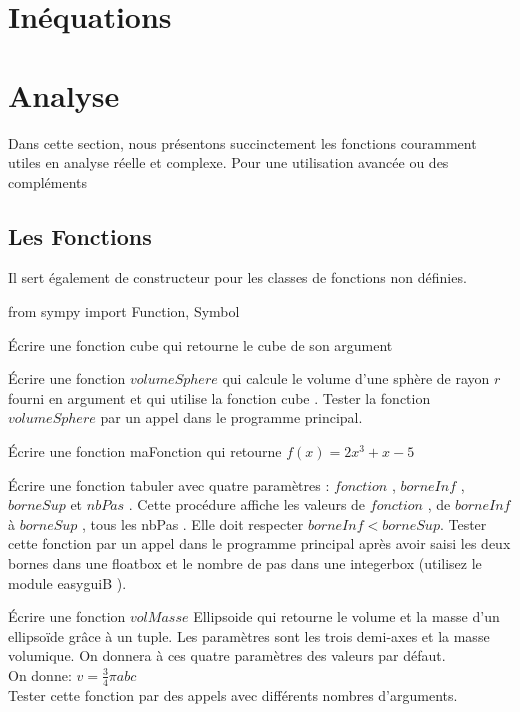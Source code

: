 \section{In\'equations}
\section{Analyse}
Dans cette section, nous présentons succinctement les fonctions couramment utiles en analyse réelle et complexe. 
Pour une utilisation avancée ou des compléments
 \subsection{Les Fonctions}
Il sert également de constructeur pour les classes de fonctions non définies.

\begin{python}
from sympy import Function, Symbol
\end{python}

\begin{exercise}
Écrire une fonction cube qui retourne le cube de son argument
\end{exercise}

\begin{exercise}
Écrire une fonction $volumeSphere$ qui calcule le volume d’une sphère de rayon $r$ fourni
en argument et qui utilise la fonction cube .
Tester la fonction $volumeSphere$ par un appel dans le programme principal.
\end{exercise}

\begin{exercise}
Écrire une fonction maFonction qui retourne $f(x) = 2x^{3} + x - 5$
\end{exercise}

\begin{exercise}
Écrire une fonction tabuler avec quatre paramètres : $fonction$ , $borneInf$ , $borneSup$
et $nbPas$ . Cette procédure affiche les valeurs de $fonction$ , de $borneInf$ à $borneSup$ ,
tous les nbPas . Elle doit respecter $borneInf < borneSup$.
Tester cette fonction par un appel dans le programme principal après avoir saisi les
deux bornes dans une floatbox et le nombre de pas dans une integerbox (utilisez le
module easyguiB ).
\end{exercise}

\begin{exercise}
Écrire une fonction $volMasse$ Ellipsoide qui retourne le volume et la masse d'un ellipsoïde grâce à un tuple. Les paramètres sont les trois demi-axes et la masse volumique. On donnera à ces quatre paramètres des valeurs par défaut. \\
On donne: $v = \frac{3}{4} \pi abc$ \\
Tester cette fonction par des appels avec différents nombres d'arguments.
\end{exercise}

